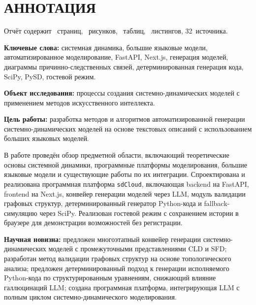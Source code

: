 






\newpage
\thispagestyle{empty}
\chapter*{АННОТАЦИЯ}

Отчёт содержит \pageref{LastPage}~страниц, \totalfigures~рисунков, \totaltables~таблиц, \thetotallstlistings~листингов, 32~источника.

\textbf{Ключевые слова:} системная динамика, большие языковые модели, автоматизированное моделирование, FastAPI, Next.js, генерация моделей, диаграммы причинно-следственных связей, детерминированная генерация кода, SciPy, PySD, гостевой режим.

\textbf{Объект исследования:} процессы создания системно-динамических моделей с применением методов искусственного интеллекта.

\textbf{Цель работы:} разработка методов и алгоритмов автоматизированной генерации системно-динамических моделей на основе текстовых описаний с использованием больших языковых моделей.

В работе проведён обзор предметной области, включающий теоретические основы системной динамики, программные платформы моделирования, большие языковые модели и существующие работы по их интеграции. Спроектирована и реализована программная платформа \texttt{sdCloud}, включающая backend на FastAPI, frontend на Next.js, конвейер генерации моделей через LLM, модуль валидации графовых структур, детерминированный генератор Python-кода и fallback-симуляцию через SciPy. Реализован гостевой режим с сохранением истории в браузере для демонстрации возможностей без регистрации.

\textbf{Научная новизна:} предложен многоэтапный конвейер генерации системно-динамических моделей с промежуточными представлениями CLD и SFD; разработан метод валидации графовых структур на основе топологического анализа; предложен детерминированный подход к генерации исполняемого Python-кода по структурированным уравнениям, снижающий влияние галлюцинаций LLM; создана программная платформа, интегрирующая LLM с полным циклом системно-динамического моделирования.


